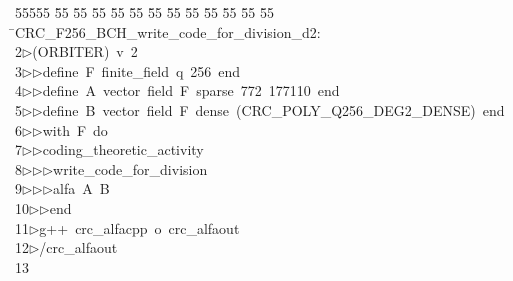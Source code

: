 %
%
\begin{tabbing}
55555 \= 55 \= 55 \= 55 \= 55 \= 55 \= 55 \= 55 \= 55 \= 55 \= 55 \= 55 \= 55 \= \>CRC\_F256\_BCH\_write\_code\_for\_division\_d2:\\[0pt]
2\>$\triangleright$\>(ORBITER)\ v\ 2\ \\[0pt]
3\>$\triangleright$\>$\triangleright$\>define\ F\ finite\_field\ q\ 256\ end\ \\[0pt]
4\>$\triangleright$\>$\triangleright$\>define\ A\ vector\ field\ F\ sparse\ 772\ 177110\ end\ \\[0pt]
5\>$\triangleright$\>$\triangleright$\>define\ B\ vector\ field\ F\ dense\ (CRC\_POLY\_Q256\_DEG2\_DENSE)\ end\ \\[0pt]
6\>$\triangleright$\>$\triangleright$\>with\ F\ do\ \\[0pt]
7\>$\triangleright$\>$\triangleright$\>coding\_theoretic\_activity\ \\[0pt]
8\>$\triangleright$\>$\triangleright$\>$\triangleright$\>write\_code\_for\_division\ \\[0pt]
9\>$\triangleright$\>$\triangleright$\>$\triangleright$\>alfa\ A\ B\ \\[0pt]
10\>$\triangleright$\>$\triangleright$\>end\\[0pt]
11\>$\triangleright$\>g++\ crc\_alfacpp\ o\ crc\_alfaout\\[0pt]
12\>$\triangleright$\>/crc\_alfaout\\[0pt]
13\>\end{tabbing}
